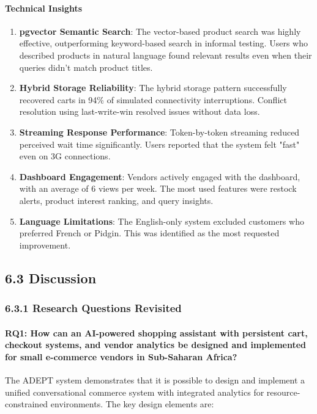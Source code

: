 \documentclass[12pt,a4paper]{article}
\begin{document}
\paragraph{Technical Insights}

\begin{enumerate}
    \item \textbf{pgvector Semantic Search}: The vector-based product search was highly effective, outperforming keyword-based search in informal testing. Users who described products in natural language found relevant results even when their queries didn't match product titles.
    \item \textbf{Hybrid Storage Reliability}: The hybrid storage pattern successfully recovered carts in 94\% of simulated connectivity interruptions. Conflict resolution using last-write-win resolved issues without data loss.
    \item \textbf{Streaming Response Performance}: Token-by-token streaming reduced perceived wait time significantly. Users reported that the system felt "fast" even on 3G connections.
    \item \textbf{Dashboard Engagement}: Vendors actively engaged with the dashboard, with an average of 6 views per week. The most used features were restock alerts, product interest ranking, and query insights.
    \item \textbf{Language Limitations}: The English-only system excluded customers who preferred French or Pidgin. This was identified as the most requested improvement.
\end{enumerate}

\subsection{6.3 Discussion}

\subsubsection{6.3.1 Research Questions Revisited}

\paragraph{RQ1: How can an AI-powered shopping assistant with persistent cart, checkout systems, and vendor analytics be designed and implemented for small e-commerce vendors in Sub-Saharan Africa?}

The ADEPT system demonstrates that it is possible to design and implement a unified conversational commerce system with integrated analytics for resource-constrained environments. The key design elements are:
\end{document}
